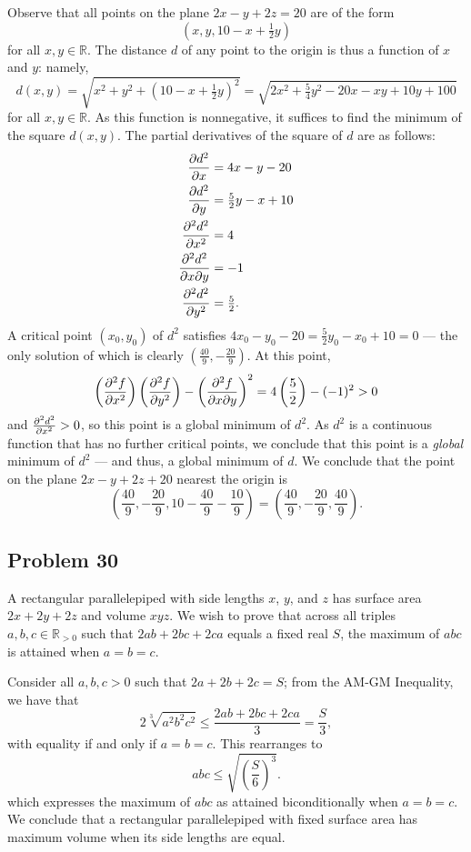 \documentclass[11pt]{article}
\begin{document}
Observe that all points on the plane $2x - y + 2z = 20$ are of the form
\[
	\left(x, y, 10 - x + \tfrac{1}{2}y\right)
\]
for all $x, y \in \mathbb{R}$. The distance $d$ of any point to the origin is thus a function of $x$ and $y$: namely,
\[
	d(x, y) = \sqrt{x^{2} + y^{2} + \left(10 - x + \tfrac{1}{2}y\right)^{2}} = \sqrt{2x^{2} + \tfrac{5}{4}y^{2} - 20x - xy + 10y + 100}
\]
for all $x, y \in \mathbb{R}$. As this function is nonnegative, it suffices to find the minimum of the square $d(x, y)$. The partial derivatives of the square of $d$ are as follows:
\begin{align*}
	\pdv{d^{2}}{x} &= 4x - y - 20 \\
	\pdv{d^{2}}{y} &= \tfrac{5}{2}y - x + 10 \\
	\pdv[2]{d^{2}}{x} &= 4 \\
	\pdv[2]{d^{2}}{x}{y} &= -1 \\
	\pdv[2]{d^{2}}{y} &= \tfrac{5}{2}.
\end{align*}
A critical point $(x_{0}, y_{0})$ of $d^{2}$ satisfies $4x_{0} - y_{0} - 20 = \tfrac{5}{2}y_{0} - x_{0} + 10 = 0$ --- the only solution of which is clearly $\left( \tfrac{40}{9}, -\tfrac{20}{9} \right)$. At this point,
\[
	\left( \pdv[2]{f}{x} \right) \left( \pdv[2]{f}{y} \right) - \left( \pdv[2]{f}{x}{y} \right)^{2} = 4 \left( \frac{5}{2} \right) - (-1)^{2} > 0
\]
and $\pdv[2]{d^{2}}{x} > 0$, so this point is a global minimum of $d^{2}$. As $d^{2}$ is a continuous function that has no further critical points, we conclude that this point is a \textit{global} minimum of $d^{2}$ --- and thus, a global minimum of $d$. We conclude that the point on the plane $2x - y + 2z + 20$ nearest the origin is 
\[
	\left( \frac{40}{9}, -\frac{20}{9}, 10 - \frac{40}{9} - \frac{10}{9} \right) = \boxed{\left( \frac{40}{9}, -\frac{20}{9}, \frac{40}{9} \right)}.
\]


\subsection{Problem 30}

A rectangular parallelepiped with side lengths $x$, $y$, and $z$ has surface area $2x + 2y + 2z$ and volume $xyz$. We wish to prove that across all triples $a, b, c \in \mathbb{R}_{> 0}$ such that $2ab + 2bc + 2ca$ equals a fixed real $S$, the maximum of $abc$ is attained when $a = b = c$.

Consider all $a, b, c > 0$ such that $2a + 2b + 2c = S$; from the AM-GM Inequality, we have that
\[
	2\sqrt[3]{a^{2}b^{2}c^{2}} \le \frac{2ab + 2bc + 2ca}{3} = \frac{S}{3},
\]
with equality if and only if $a = b = c$. This rearranges to
\[
	abc \le \sqrt{\left( \frac{S}{6} \right)^{3}}.
\]
which expresses the maximum of $abc$ as attained biconditionally when $a = b = c$. We conclude that a rectangular parallelepiped with fixed surface area has maximum volume when its side lengths are equal.
\end{document}
